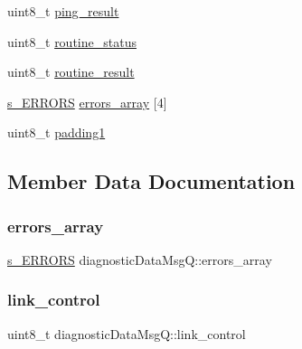 \begin{DoxyCompactItemize}
\item 
uint8\+\_\+t \mbox{\hyperlink{structdiagnostic_data_msg_q_aa267ac90c45771daeeee3eec5e51abf2}{ping\+\_\+result}}
\item 
uint8\+\_\+t \mbox{\hyperlink{structdiagnostic_data_msg_q_a549e1a6a2eecb5b966b5a10c6274ccf3}{routine\+\_\+status}}
\item 
uint8\+\_\+t \mbox{\hyperlink{structdiagnostic_data_msg_q_a66ad8d88474dbe4840efe79f4a071efd}{routine\+\_\+result}}
\item 
\mbox{\hyperlink{module_one_read_eth_phy_8h_a20a1de38f8a31b563f5185bf73d836b0}{s\+\_\+\+E\+R\+R\+O\+RS}} \mbox{\hyperlink{structdiagnostic_data_msg_q_a70a56a13a2c9f8f28679b51484db2557}{errors\+\_\+array}} \mbox{[}4\mbox{]}
\item 
uint8\+\_\+t \mbox{\hyperlink{structdiagnostic_data_msg_q_aa5156e3e0221275658d1bdfd3d2299bb}{padding1}}
\end{DoxyCompactItemize}


\subsection{Member Data Documentation}
\mbox{\label{structdiagnostic_data_msg_q_a70a56a13a2c9f8f28679b51484db2557}} 
\subsubsection{\texorpdfstring{errors\+\_\+array}{errors\_array}}
{\footnotesize\ttfamily \mbox{\hyperlink{module_one_read_eth_phy_8h_a20a1de38f8a31b563f5185bf73d836b0}{s\+\_\+\+E\+R\+R\+O\+RS}} diagnostic\+Data\+Msg\+Q\+::errors\+\_\+array}

\mbox{\label{structdiagnostic_data_msg_q_a955326ea4924202ca8e42d37aec42532}} 
\subsubsection{\texorpdfstring{link\+\_\+control}{link\_control}}
{\footnotesize\ttfamily uint8\+\_\+t diagnostic\+Data\+Msg\+Q\+::link\+\_\+control}

